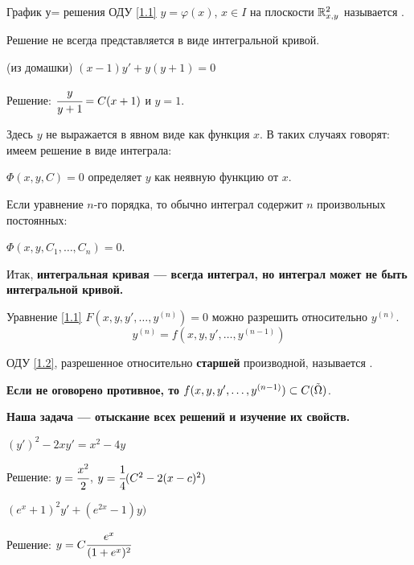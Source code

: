 \vspace{3mm}

\begin{Def}
График у= решения ОДУ \ref{1.1} $y = \varphi(x)$, $x \in I$ на плоскости $\mathbb{R}^2_{x, y}$ называется .
\end{Def}

Решение не всегда представляется в виде интегральной кривой.

\begin{example}
(из домашки) $(x - 1)y' + y(y + 1) = 0$

Решение: $\cfrac{y}{y + 1} = C(x + 1)$ и $y = 1$.

Здесь $y$ не выражается в явном виде как функция $x$. В таких случаях говорят: имеем решение в виде интеграла:

$\Phi(x, y, C) = 0$ определяет $y$ как неявную функцию от $x$.
\end{example}

\begin{note}
Если уравнение $n$-го порядка, то обычно интеграл содержит $n$ произвольных постоянных:

$\Phi(x, y, C_1, \ldots, C_n) = 0$.
\end{note}

Итак, \textbf{интегральная кривая --- всегда  интеграл, но интеграл может не быть интегральной кривой.}

\vspace{5mm}

Уравнение \ref{1.1} $F(x, y, y', \ldots, y^{(n)} ) = 0$ можно разрешить относительно $y^{(n)}$.
\begin{equation}\label{1.2}
    y^{(n)} = f(x, y, y', \ldots, y^{(n - 1)})
\end{equation}

\begin{Def}
ОДУ \ref{1.2}, разрешенное относительно \textbf{старшей} производной, называется .
\end{Def}

\vspace{3mm}

\textbf{Если не оговорено противное, то $f(x, y, y', \ldots, y^{(n - 1)}) \subset C(\Tilde{\Omega})$}.

\textbf{Наша задача --- отыскание всех решений и изучение их свойств.}

\begin{example}\label{ex5}
$(y')^2 - 2xy' = x^2 - 4y$

Решение: $y = \cfrac{x^2}{2}$, $y = \cfrac{1}{4}(C^2 - 2(x - c)^2)$
\end{example}
\vspace{3mm}
\begin{example}\label{ex6}
$(e^x + 1)^2y' + (e^{2x} - 1)y)$

Решение: $y = C \cfrac{e^x}{(1 + e^x)^2}$
\end{example}

